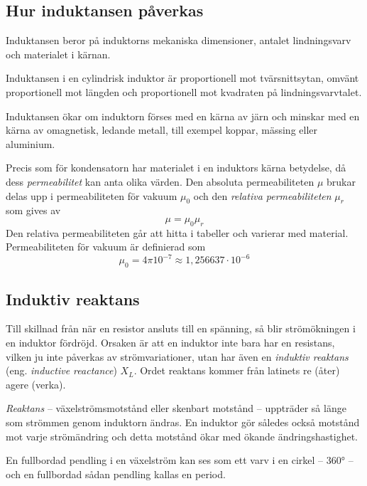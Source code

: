 \subsection{Hur induktansen påverkas}

Induktansen beror på induktorns mekaniska dimensioner, antalet lindningsvarv och
materialet i kärnan.

Induktansen i en cylindrisk induktor är proportionell mot tvärsnittsytan, omvänt
proportionell mot längden och proportionell mot kvadraten på lindningsvarvtalet.

Induktansen ökar om induktorn förses med en kärna av järn och minskar med en
kärna av omagnetisk, ledande metall, till exempel koppar, mässing eller aluminium.

Precis som för kondensatorn har materialet i en induktors kärna betydelse,
då dess \emph{permeabilitet} kan anta olika värden. Den absoluta permeabiliteten
\(\mu\) brukar delas upp i permeabiliteten för vakuum \(\mu_0\) och den
\emph{relativa permeabiliteten} \(\mu_r\) som gives av
\[\mu = \mu_0\mu_r\]
Den relativa permeabiliteten går att hitta i tabeller och varierar med material.
Permeabiliteten för vakuum är definierad som
\[\mu_0 = 4\pi 10^{-7} \approx 1,256637 \cdot 10^{-6}\]

\subsection{Induktiv reaktans}
\label{induktiv_reaktans} 

Till skillnad från när en resistor ansluts till en spänning, så blir
strömökningen i en induktor fördröjd. Orsaken är att en induktor inte bara har
en resistans, vilken ju inte påverkas av strömvariationer, utan har även en
\emph{induktiv reaktans} (eng. \emph{inductive reactance}) \(X_L\).
Ordet reaktans kommer från latinets re (åter) agere (verka).

\emph{Reaktans} -- växelströmsmotstånd eller skenbart motstånd -- uppträder så
länge som strömmen genom induktorn ändras. En induktor gör således också
motstånd mot varje strömändring och detta motstånd ökar med ökande
ändringshastighet.

En fullbordad pendling i en växelström kan ses som ett varv i en cirkel --
\ang{360} -- och en fullbordad sådan pendling kallas en period.

